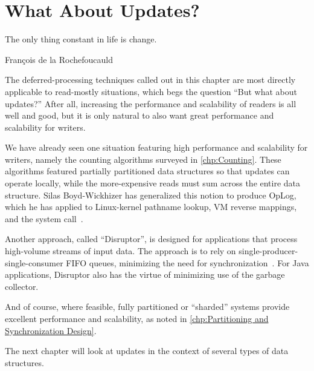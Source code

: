 
\section{What About Updates?}
\label{sec:defer:What About Updates?}
%
\epigraph{The only thing constant in life is change.}
	 {Fran\c{c}ois de la Rochefoucauld}

The deferred-processing techniques called out in this chapter are most
directly applicable to read-mostly situations, which begs the question
``But what about updates?''
After all, increasing the performance and scalability of readers is all
well and good, but it is only natural to also want great performance and
scalability for writers.

We have already seen one situation featuring high performance and
scalability for writers, namely the counting algorithms surveyed in
\cref{chp:Counting}.
These algorithms featured partially partitioned data structures so
that updates can operate locally, while the more-expensive reads
must sum across the entire data structure.
Silas Boyd-Wickhizer has generalized this notion to produce
OpLog, which he has applied to
Linux-kernel pathname lookup, VM reverse mappings, and the  system
call~\cite{SilasBoydWickizerPhD}.

Another approach, called ``Disruptor'', is designed for applications
that process high-volume streams of input data.
The approach is to rely on single-producer-single-consumer FIFO queues,
minimizing the need for synchronization~\cite{AdrianSutton2013LCA:Disruptor}.
For Java applications, Disruptor also has the virtue of minimizing use
of the garbage collector.

And of course, where feasible, fully partitioned or ``sharded'' systems
provide excellent performance and scalability, as noted in
\cref{chp:Partitioning and Synchronization Design}.

The next chapter will look at updates in the context of several types
of data structures.
